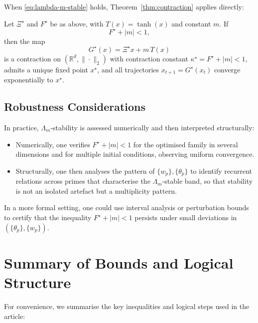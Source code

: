 \documentclass[11pt,letterpaper]{article}
\begin{document}
When \eqref{eq:lambda-m-stable} holds, Theorem~\ref{thm:contraction}
applies directly:

\begin{corollary}
Let \(\Xi^\star\) and \(F^\star\) be as above, with \(T(x) = \tanh(x)\)
and constant \(m\). If
\[
  F^\star + |m| < 1,
\]
then the map
\[
  G^\star(x) = \Xi^\star x + m\,T(x)
\]
is a contraction on \((\mathbb{R}^d,\|\cdot\|_2)\) with contraction
constant \(\kappa^\star = F^\star + |m| < 1\), admits a unique fixed
point \(x^\star\), and all trajectories \(x_{t+1} = G^\star(x_t)\)
converge exponentially to \(x^\star\).
\end{corollary}

\subsection{Robustness Considerations}

In practice, \(\Lambda_m\)-stability is assessed numerically and then
interpreted structurally:

\begin{itemize}[leftmargin=*]
  \item Numerically, one verifies \(F^\star + |m| < 1\) for the
        optimised family in several dimensions and for multiple initial
        conditions, observing uniform convergence.
  \item Structurally, one then analyses the pattern of
        \(\{w_p\},\{\theta_p\}\) to identify recurrent relations across
        primes that characterise the \(\Lambda_m\)-stable band, so that
        stability is not an isolated artefact but a multiplicity pattern.
\end{itemize}

In a more formal setting, one could use interval analysis or perturbation
bounds to certify that the inequality \(F^\star + |m| < 1\) persists
under small deviations in \((\{\theta_p\},\{w_p\})\).

\section{Summary of Bounds and Logical Structure}

For convenience, we summarise the key inequalities and logical steps
used in the article:
\end{document}
